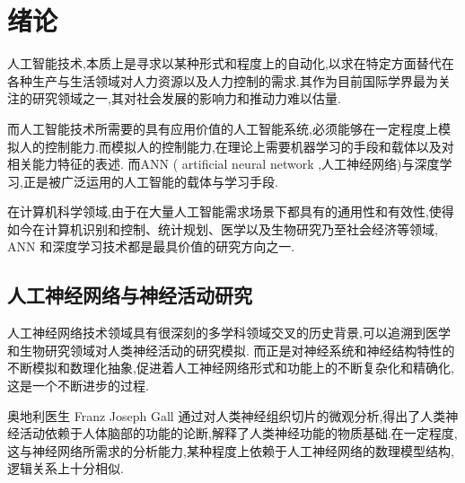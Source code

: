 

\chapter{绪论}

人工智能技术,本质上是寻求以某种形式和程度上的自动化,以求在特定方面替代在各种生产与生活领域对人力资源以及人力控制的需求.其作为目前国际学界最为关注的研究领域之一,其对社会发展的影响力和推动力难以估量.

而人工智能技术所需要的具有应用价值的人工智能系统,必须能够在一定程度上模拟人的控制能力.而模拟人的控制能力,在理论上需要机器学习的手段和载体以及对相关能力特征的表述. 而ANN ( artificial neural network ,人工神经网络)与深度学习,正是被广泛运用的人工智能的载体与学习手段.

在计算机科学领域,由于在大量人工智能需求场景下都具有的通用性和有效性,使得如今在计算机识别和控制、统计规划、医学以及生物研究乃至社会经济等领域, ANN 和深度学习技术都是最具价值的研究方向之一.

\section{人工神经网络与神经活动研究}



人工神经网络技术领域具有很深刻的多学科领域交叉的历史背景,可以追溯到医学和生物研究领域对人类神经活动的研究模拟. 而正是对神经系统和神经结构特性的不断模拟和数理化抽象,促进着人工神经网络形式和功能上的不断复杂化和精确化,这是一个不断进步的过程.

奥地利医生 Franz Joseph Gall 通过对人类神经组织切片的微观分析,得出了人类神经活动依赖于人体脑部的功能的论断,解释了人类神经功能的物质基础.在一定程度,这与神经网络所需求的分析能力,某种程度上依赖于人工神经网络的数理模型结构,逻辑关系上十分相似.

